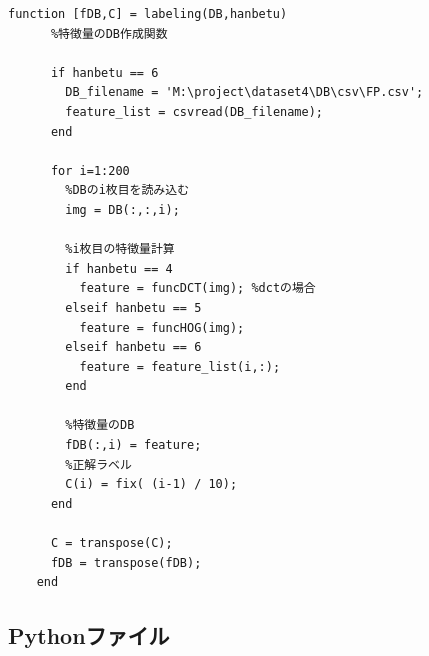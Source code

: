 \documentclass[10.5pt,a4j]{jarticle}
\begin{document}
\begin{lstlisting}[caption=labeling.m,label=labeling]
	function [fDB,C] = labeling(DB,hanbetu)
	  %特徴量のDB作成関数

	  if hanbetu == 6
	    DB_filename = 'M:\project\dataset4\DB\csv\FP.csv';
	    feature_list = csvread(DB_filename);
	  end

	  for i=1:200
	    %DBのi枚目を読み込む
	    img = DB(:,:,i);

	    %i枚目の特徴量計算
	    if hanbetu == 4
	      feature = funcDCT(img); %dctの場合
	    elseif hanbetu == 5
	      feature = funcHOG(img);
	    elseif hanbetu == 6
	      feature = feature_list(i,:);
	    end

	    %特徴量のDB
	    fDB(:,i) = feature;
	    %正解ラベル
	    C(i) = fix( (i-1) / 10);
	  end

	  C = transpose(C);
	  fDB = transpose(fDB);
	end
\end{lstlisting}

	\newpage
	\subsection{Pythonファイル}
	
	
	
	
	
\end{document}
